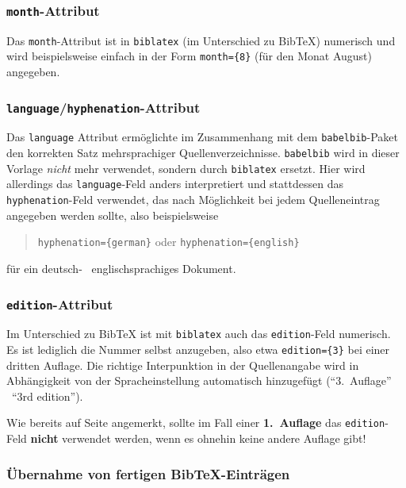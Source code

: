 \subsubsection{\texttt{month}-Attribut}

Das \texttt{month}-Attribut ist in \texttt{biblatex} (im Unterschied zu BibTeX) numerisch
und wird beispielsweise einfach in der Form \verb!month={8}! (für den Monat August)
angegeben.

\subsubsection{\texttt{language}/\texttt{hyphenation}-Attribut}

Das \texttt{language} Attribut ermöglichte im Zusammenhang mit dem \texttt{babelbib}-Paket 
den korrekten Satz mehrsprachiger Quellenverzeichnisse. \texttt{babelbib} wird in 
dieser Vorlage \emph{nicht} mehr verwendet, sondern durch \texttt{biblatex} \cite{Lehman2015} ersetzt.
Hier wird allerdings das \texttt{language}-Feld anders interpretiert und
stattdessen das \texttt{hyphenation}-Feld verwendet, das nach Möglichkeit 
bei jedem Quelleneintrag angegeben werden sollte, also beispielsweise
\begin{quote}
\verb!hyphenation={german}! \quad oder \quad \verb!hyphenation={english}!
\end{quote}
für ein deutsch- \bzw\ englischsprachiges Dokument.

\subsubsection{\texttt{edition}-Attribut}

Im Unterschied zu BibTeX ist mit \texttt{biblatex} auch das \texttt{edition}-Feld numerisch.
Es ist lediglich die Nummer selbst anzugeben, also etwa
\verb!edition={3}!
bei einer dritten Auflage. Die richtige Interpunktion in der Quellenangabe wird in Abhängigkeit von der Spracheinstellung automatisch hinzugefügt 
("`3.\ Auflage"' \bzw\ "`3rd edition"').

Wie bereits auf Seite \pageref{sec:@book} angemerkt, sollte im Fall einer
\textbf{1.~Auflage} das \texttt{edition}-Feld \textbf{nicht} verwendet werden,
wenn es ohnehin keine andere Auflage gibt!


\subsubsection{Übernahme von fertigen BibTeX-Einträgen}

